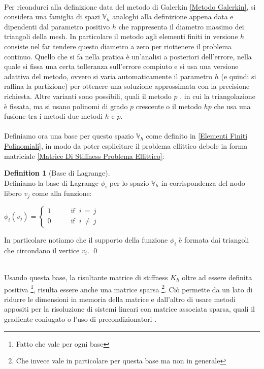 \documentclass[12pt,a4paper]{report}
\theoremstyle{theorem}
\theoremstyle{definition}
\newtheorem{definition}{Definition}[section]
\begin{document}
\hfill \\
Per ricondurci alla definizione data del metodo di Galerkin \ref{Metodo Galerkin}, si considera una famiglia di spazi $\mathbb{V}_{h}$ analoghi alla definizione appena data e dipendenti dal parametro positivo $h$ che rappresenta il diametro massimo dei triangoli della mesh. In particolare il  metodo agli elementi finiti in versione $h$ consiste nel far tendere questo diametro a zero per riottenere il problema continuo. Quello che si fa nella pratica è un'analisi a posteriori dell'errore, nella quale si fissa una certa tolleranza sull'errore compiuto e si usa una versione adattiva del metodo, ovvero si varia automaticamente il parametro $h$ (e quindi si raffina la partizione) per ottenere una soluzione approssimata con la precisione richiesta. Altre varianti sono possibili, quali il metodo $p$ \cite{babuvska1981p}, in cui la triangolazione è fissata, ma si usano polinomi di grado $p$ crescente o il metodo $hp$ \cite{babuvska1994hp} che usa una fusione tra i metodi due metodi $h$ e $p$.\\
\hfill \\
Definiamo ora una base per questo spazio $\mathbb{V}_{h}$ come definito in \ref{Elementi Finiti Polinomiali}, in modo da poter esplicitare il problema ellittico debole in forma matriciale \ref{Matrice Di Stiffness Problema Ellittico}:
\begin{definition} [Base di Lagrange]  \label{Base di Lagrange}
\hfill \\
Definiamo la base di Lagrange $\phi_{i}$ per lo spazio $\mathbb{V}_{h}$ in corrispondenza del nodo libero $v_{j}$ come alla funzione:
\begin{center}
\begin{math}
\phi_{i}(v_{j}) = \left\{ \begin{array}{ll}
         1 \qquad & \mbox{if $\ i \, = \, j$}\\
         0 \qquad & \mbox{if $\ i \, \neq \, j$}\end{array} \right.
\end{math}
\end{center}
In particolare notiamo che il supporto della funzione $\phi_{i}$ è formata dai triangoli che circondano il vertice $v_{i}$.
\qed
\end{definition}
\hfill \\
Usando questa base, la risultante matrice di stiffness $K_{h}$ oltre ad essere definita positiva \footnote{Fatto che vale per ogni base}, risulta essere anche una matrice sparsa \footnote{Che invece vale in particolare per questa base ma non in generale}. Ciò permette da un lato di ridurre le dimensioni in memoria della matrice e dall'altro di usare metodi appositi per la risoluzione di sistemi lineari con matrice associata sparsa, quali il gradiente coniugato o l'uso di precondizionatori \cite{SaadSparse}.\\
\end{document}
